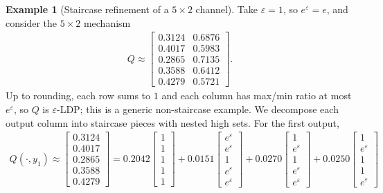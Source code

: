 \documentclass{article}
\theoremstyle{plain}
\theoremstyle{definition}
\newtheorem{example}[theorem]{Example}
\theoremstyle{plain}
\newcommand{\eps}{\varepsilon}
\begin{document}
\begin{example}[Staircase refinement of a $5\times 2$ channel]
\label{ex:staircase-refinement}
Take $\eps=1$, so $e^\eps=e$, and consider the $5\times 2$ mechanism
\begin{align*}
    Q \approx
    \begin{bmatrix}
    0.3124 & 0.6876\\
    0.4017 & 0.5983\\
    0.2865 & 0.7135\\
    0.3588 & 0.6412\\
    0.4279 & 0.5721
    \end{bmatrix}.
\end{align*}
Up to rounding, each row sums to $1$ and each column has max/min ratio at most $e^\eps$, so $Q$ is $\eps$-LDP; this is a generic non-staircase example. We decompose each output column into staircase pieces with nested high sets. For the first output,
\begin{align*}
    Q(\cdot,y_1)
    \approx
    \begin{bmatrix}
    0.3124\\
    0.4017\\
    0.2865\\
    0.3588\\
    0.4279
    \end{bmatrix}
    =
    0.2042
    \begin{bmatrix}
    1\\1\\1\\1\\1
    \end{bmatrix}
    +
    0.0151
    \begin{bmatrix}
    e^\eps\\ e^\eps\\ 1\\ e^\eps\\ e^\eps
    \end{bmatrix}
    +
    0.0270
    \begin{bmatrix}
    1\\ e^\eps\\ 1\\ e^\eps\\ e^\eps
    \end{bmatrix}
    +
    0.0250
    \begin{bmatrix}
    1\\ e^\eps\\ 1\\ 1\\ e^\eps

\end{bmatrix}
\end{align*}
\end{example}
\end{document}

